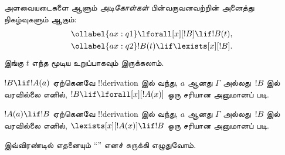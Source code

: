 \documentclass[../../../include/open-logic-section]{subfiles}
\begin{document}


\begin{defn}[அளவையடைகளுக்கான அடிகோள்கள்]
அளவையடைகளை ஆளும் \emph{அடிகோள்கள்} பின்வருவனவற்றின் அனைத்து
நிகழ்வுகளும் ஆகும்:
\begin{align}
\ollabel{ax:q1} & \lforall[x][!B] \lif !B(t), \\
\ollabel{ax:q2} & !B(t) \lif \lexists[x][!B].
\end{align}
இங்கு $t$ எந்த மூடிய உறுப்பாகவும் இருக்கலாம்.
\end{defn}

\begin{defn}[அளவையடைகளுக்கான விதிகள்]
\item $!B \lif !A(a)$ ஏற்கெனவே !!{derivation} இல் வந்து, $a$ ஆனது
  $\Gamma$ அல்லது~$!B$ இல் வரவில்லை எனில், $!B \lif
  \lforall[x][!A(x)]$ ஒரு சரியான அனுமானப் படி.
\item $!A(a) \lif !B$ ஏற்கெனவே !!{derivation} இல் வந்து, $a$ ஆனது
  $\Gamma$ அல்லது~$!B$ இல் வரவில்லை எனில், $\lexists[x][!A(x)] \lif
  !B$ ஒரு சரியான அனுமானப் படி.
\end{defn}

இவ்விரண்டில் எதனையும் ``\QR'' எனச் சுருக்கி எழுதுவோம்.
\end{document}
